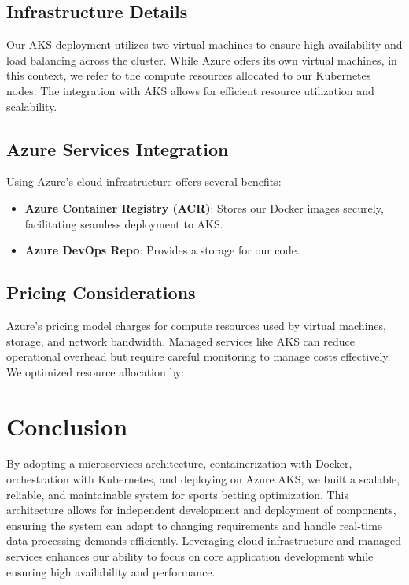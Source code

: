 \subsection{Infrastructure Details}

Our AKS deployment utilizes two virtual machines to ensure high availability and load balancing across the cluster. While Azure offers its own virtual machines, in this context, we refer to the compute resources allocated to our Kubernetes nodes. The integration with AKS allows for efficient resource utilization and scalability.

\subsection{Azure Services Integration}

Using Azure's cloud infrastructure offers several benefits:

\begin{itemize}
    \item \textbf{Azure Container Registry (ACR)}: Stores our Docker images securely, facilitating seamless deployment to AKS.
    \item \textbf{Azure DevOps Repo}: Provides a storage for our code.
\end{itemize}

\subsection{Pricing Considerations}

Azure's pricing model charges for compute resources used by virtual machines, storage, and network bandwidth. Managed services like AKS can reduce operational overhead but require careful monitoring to manage costs effectively. We optimized resource allocation by:


\section{Conclusion}

By adopting a microservices architecture, containerization with Docker, orchestration with Kubernetes, and deploying on Azure AKS, we built a scalable, reliable, and maintainable system for sports betting optimization. This architecture allows for independent development and deployment of components, ensuring the system can adapt to changing requirements and handle real-time data processing demands efficiently. Leveraging cloud infrastructure and managed services enhances our ability to focus on core application development while ensuring high availability and performance.

